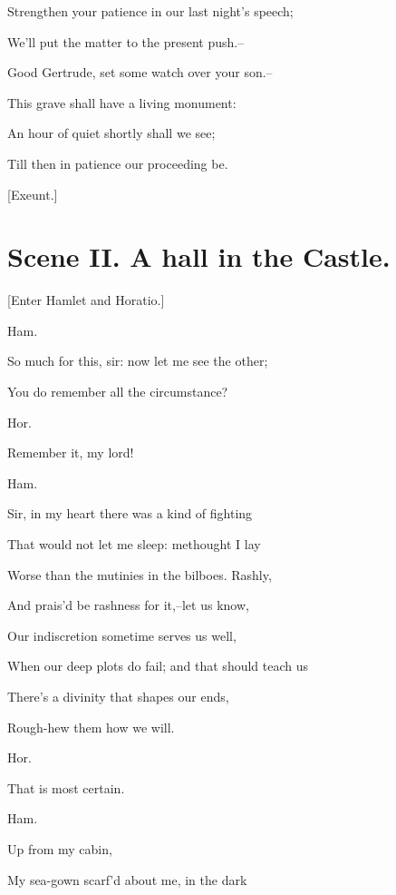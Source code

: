 \documentclass[12pt]{book}
\begin{document}
Strengthen your patience in our last night's speech;

We'll put the matter to the present push.--

Good Gertrude, set some watch over your son.--

This grave shall have a living monument:

An hour of quiet shortly shall we see;

Till then in patience our proceeding be.



[Exeunt.]







\section*{Scene II. A hall in the Castle.}



[Enter Hamlet and Horatio.]



Ham.

So much for this, sir: now let me see the other;

You do remember all the circumstance?



Hor.

Remember it, my lord!



Ham.

Sir, in my heart there was a kind of fighting

That would not let me sleep: methought I lay

Worse than the mutinies in the bilboes. Rashly,

And prais'd be rashness for it,--let us know,

Our indiscretion sometime serves us well,

When our deep plots do fail; and that should teach us

There's a divinity that shapes our ends,

Rough-hew them how we will.



Hor.

That is most certain.



Ham.

Up from my cabin,

My sea-gown scarf'd about me, in the dark
\end{document}
